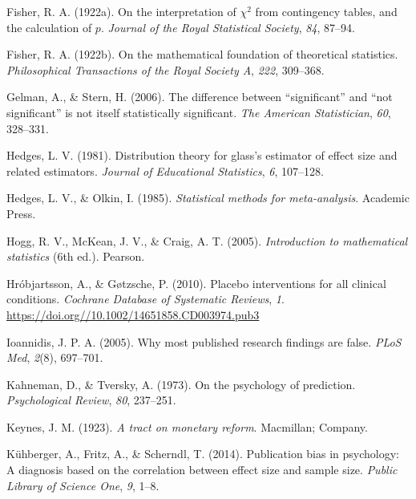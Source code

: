 \documentclass[
  a4paper,
]{book}
\newlength{\cslhangindent}
\newlength{\cslentryspacingunit} %
\newenvironment{CSLReferences}[2] %
 {%
  \setlength{\parindent}{0pt}
  \ifodd #1
  \let\oldpar\par
  \def\par{\hangindent=\cslhangindent\oldpar}
  \fi
  \setlength{\parskip}{#2\cslentryspacingunit}
 }%
 {}
\begin{document}
\begin{CSLReferences}{1}{0}
\leavevmode{}%
Fisher, R. A. (1922a). On the interpretation of \(\chi^2\) from
contingency tables, and the calculation of \(p\). \emph{Journal of the
Royal Statistical Society}, \emph{84}, 87--94.

\leavevmode{}%
Fisher, R. A. (1922b). On the mathematical foundation of theoretical
statistics. \emph{Philosophical Transactions of the Royal Society A},
\emph{222}, 309--368.

\leavevmode{}%
Gelman, A., \& Stern, H. (2006). The difference between
{``significant''} and {``not significant''} is not itself statistically
significant. \emph{The American Statistician}, \emph{60}, 328--331.

\leavevmode{}%
Hedges, L. V. (1981). Distribution theory for glass's estimator of
effect size and related estimators. \emph{Journal of Educational
Statistics}, \emph{6}, 107--128.

\leavevmode{}%
Hedges, L. V., \& Olkin, I. (1985). \emph{Statistical methods for
meta-analysis}. Academic Press.

\leavevmode{}%
Hogg, R. V., McKean, J. V., \& Craig, A. T. (2005). \emph{Introduction
to mathematical statistics} (6th ed.). Pearson.

\leavevmode{}%
Hróbjartsson, A., \& Gøtzsche, P. (2010). Placebo interventions for all
clinical conditions. \emph{Cochrane Database of Systematic Reviews},
\emph{1}. \url{https://doi.org//10.1002/14651858.CD003974.pub3}

\leavevmode{}%
Ioannidis, J. P. A. (2005). Why most published research findings are
false. \emph{PLoS Med}, \emph{2}(8), 697--701.

\leavevmode{}%
Kahneman, D., \& Tversky, A. (1973). On the psychology of prediction.
\emph{Psychological Review}, \emph{80}, 237--251.

\leavevmode{}%
Keynes, J. M. (1923). \emph{A tract on monetary reform}. Macmillan;
Company.

\leavevmode{}%
Kühberger, A., Fritz, A., \& Scherndl, T. (2014). Publication bias in
psychology: A diagnosis based on the correlation between effect size and
sample size. \emph{Public Library of Science One}, \emph{9}, 1--8.


\end{CSLReferences}
\end{document}
